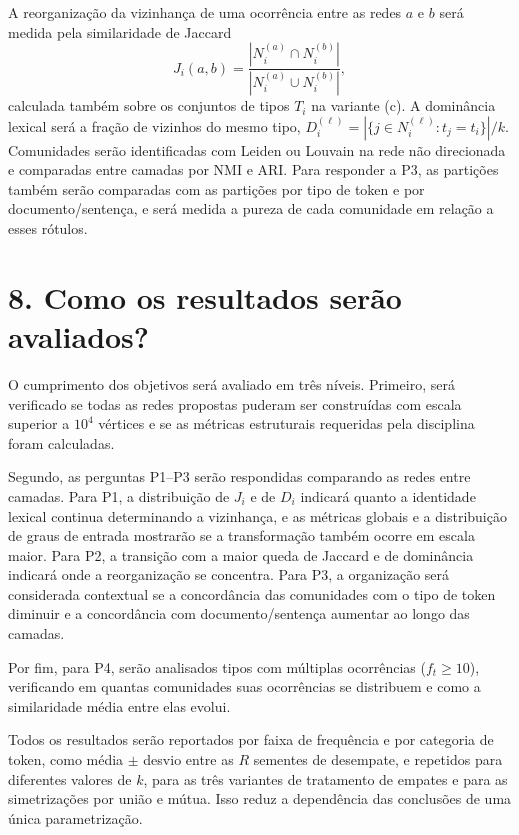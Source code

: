 \documentclass[11pt,a4paper]{article}
\begin{document}
A reorganização da vizinhança de uma ocorrência entre as redes $a$ e $b$ será
medida pela similaridade de Jaccard
\[
J_i(a,b)=\frac{|N_i^{(a)}\cap N_i^{(b)}|}{|N_i^{(a)}\cup N_i^{(b)}|},
\]
calculada também sobre os conjuntos de tipos $T_i$ na variante (c). A
dominância lexical será a fração de vizinhos do mesmo tipo,
$D_i^{(\ell)}=|\{j\in N_i^{(\ell)}: t_j=t_i\}|/k$. Comunidades serão
identificadas com Leiden ou Louvain na rede não direcionada e comparadas entre
camadas por NMI e ARI. Para responder a P3, as partições também serão
comparadas com as partições por tipo de token e por documento/sentença, e
será medida a pureza de cada comunidade em relação a esses rótulos.

\section*{8. Como os resultados serão avaliados?}

O cumprimento dos objetivos será avaliado em três níveis. Primeiro, será
verificado se todas as redes propostas puderam ser construídas com escala
superior a $10^4$ vértices e se as métricas estruturais requeridas pela
disciplina foram calculadas.

Segundo, as perguntas P1--P3 serão respondidas comparando as redes entre
camadas. Para P1, a distribuição de $J_i$ e de $D_i$ indicará quanto a
identidade lexical continua determinando a vizinhança, e as métricas globais e
a distribuição de graus de entrada mostrarão se a transformação também ocorre
em escala maior. Para P2, a transição com a maior queda de Jaccard e de
dominância indicará onde a reorganização se concentra. Para P3, a organização
será considerada contextual se a concordância das comunidades com o tipo de
token diminuir e a concordância com documento/sentença aumentar ao longo das
camadas.

Por fim, para P4, serão analisados tipos com múltiplas ocorrências
($f_t\ge 10$), verificando em quantas comunidades suas ocorrências se
distribuem e como a similaridade média entre elas evolui.

Todos os resultados serão reportados por faixa de frequência e por categoria
de token, como média $\pm$ desvio entre as $R$ sementes de desempate, e
repetidos para diferentes valores de $k$, para as três variantes de tratamento
de empates e para as simetrizações por união e mútua. Isso reduz a
dependência das conclusões de uma única parametrização.
\end{document}
